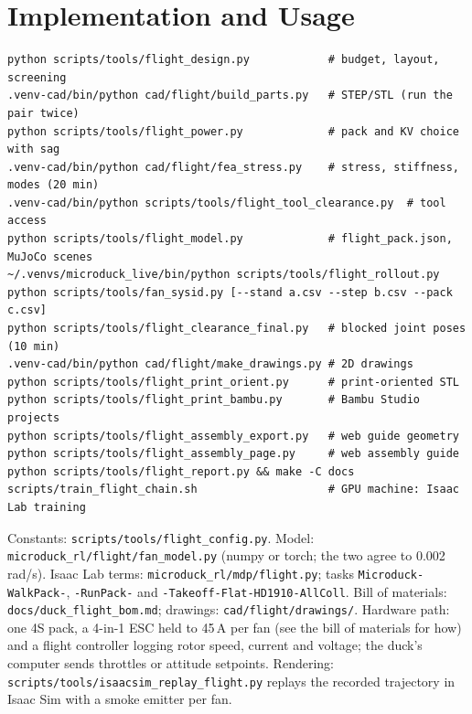 \documentclass[11pt]{article}
\begin{document}
\section{Implementation and Usage}\label{sec:use}
{\small
\begin{verbatim}
python scripts/tools/flight_design.py            # budget, layout, screening
.venv-cad/bin/python cad/flight/build_parts.py   # STEP/STL (run the pair twice)
python scripts/tools/flight_power.py             # pack and KV choice with sag
.venv-cad/bin/python cad/flight/fea_stress.py    # stress, stiffness, modes (20 min)
.venv-cad/bin/python scripts/tools/flight_tool_clearance.py  # tool access
python scripts/tools/flight_model.py             # flight_pack.json, MuJoCo scenes
~/.venvs/microduck_live/bin/python scripts/tools/flight_rollout.py
python scripts/tools/fan_sysid.py [--stand a.csv --step b.csv --pack c.csv]
python scripts/tools/flight_clearance_final.py   # blocked joint poses (10 min)
.venv-cad/bin/python cad/flight/make_drawings.py # 2D drawings
python scripts/tools/flight_print_orient.py      # print-oriented STL
python scripts/tools/flight_print_bambu.py       # Bambu Studio projects
python scripts/tools/flight_assembly_export.py   # web guide geometry
python scripts/tools/flight_assembly_page.py     # web assembly guide
python scripts/tools/flight_report.py && make -C docs
scripts/train_flight_chain.sh                    # GPU machine: Isaac Lab training
\end{verbatim}}
Constants: \texttt{scripts/tools/flight\_config.py}. Model: \texttt{microduck\_rl/flight/fan\_model.py}
(numpy or torch; the two agree to 0.002\,rad/s). Isaac Lab terms:
\texttt{microduck\_rl/mdp/flight.py}; tasks \texttt{Microduck-WalkPack-}, \texttt{-RunPack-} and
\texttt{-Takeoff-Flat-HD1910-AllColl}. Bill of materials: \texttt{docs/duck\_flight\_bom.md};
drawings: \texttt{cad/flight/drawings/}. Hardware path: one 4S pack, a 4-in-1 ESC held to 45\,A per fan (see the bill of materials for how)
and a flight controller logging rotor speed, current and voltage; the duck's computer sends
throttles or attitude setpoints. Rendering: \texttt{scripts/tools/isaacsim\_replay\_flight.py}
replays the recorded trajectory in Isaac Sim with a smoke emitter per fan.
\end{document}
